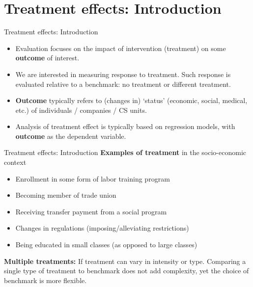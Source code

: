 \documentclass{beamer}
\begin{document}
\section{Treatment effects: Introduction}
\begin{frame}{Treatment effects: Introduction}
\begin{itemize}
    \item Evaluation focuses on the impact of intervention (treatment) on some \textbf{outcome} of interest.
    \medskip
    \item We are interested in measuring response to treatment. Such response is evaluated relative to a benchmark: no treatment or different treatment. 
    \medskip
    \item \textbf{Outcome} typically refers to (changes in)  `status' (economic, social, medical, etc.) of individuals / companies / CS units.
    \medskip
    \item Analysis of treatment effect is typically based on regression models, with \textbf{outcome} as the dependent variable.
\end{itemize}
\end{frame}
\begin{frame}{Treatment effects: Introduction}
\textbf{Examples of treatment} in the socio-economic context \\ \medskip
\begin{itemize}
    \item Enrollment in some form of labor training program
    \medskip
    \item Becoming member of trade union
    \medskip
    \item Receiving transfer payment from a social program
    \medskip
    \item Changes in regulations (imposing/alleviating restrictions)
    \medskip
    \item Being educated in small classes (as opposed to large classes) 
\end{itemize}
\bigskip
\textbf{Multiple treatments:} If treatment can vary in intensity or type. Comparing a single type of treatment to benchmark does not add complexity, yet the choice of benchmark is more flexible.
\end{frame}
\end{document}
